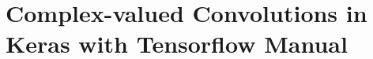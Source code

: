 \chapter{Complex-valued Convolutions in Keras with Tensorflow Manual}
\label{section:keras-complex}

